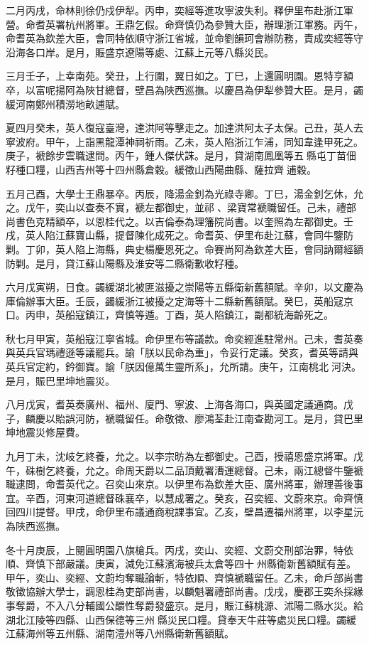 \begin{pinyinscope}
二月丙戌，命林則徐仍戍伊犁。丙申，奕經等進攻寧波失利。釋伊里布赴浙江軍營。命耆英署杭州將軍。王鼎乞假。命齊慎仍為參贊大臣，辦理浙江軍務。丙午，命耆英為欽差大臣，會同特依順守浙江省城，並命劉韻珂會辦防務，責成奕經等守沿海各口岸。是月，賑盛京遼陽等處、江蘇上元等八縣災民。

三月壬子，上幸南苑。癸丑，上行圍，翼日如之。丁巳，上還圓明園。恩特亨額卒，以富呢揚阿為陜甘總督，壁昌為陜西巡撫。以慶昌為伊犁參贊大臣。是月，蠲緩河南鄭州積澇地畝逋賦。

夏四月癸未，英人復寇臺灣，達洪阿等擊走之。加達洪阿太子太保。己丑，英人去寧波府。甲午，上詣黑龍潭神祠祈雨。乙未，英人陷浙江乍浦，同知韋逢甲死之。庚子，褫餘步雲職逮問。丙午，鍾人傑伏誅。是月，貸湖南鳳凰等五縣屯丁苗佃籽種口糧，山西吉州等十四州縣倉穀。緩徵山西陽曲縣、薩拉齊逋穀。

五月己酉，大學士王鼎暴卒。丙辰，降湯金釗為光祿寺卿。丁巳，湯金釗乞休，允之。戊午，奕山以查奏不實，褫左都御史，並祁、梁寶常褫職留任。己未，禮部尚書色克精額卒，以恩桂代之。以吉倫泰為理籓院尚書。以奎照為左都御史。壬戌，英人陷江蘇寶山縣，提督陳化成死之。命耆英、伊里布赴江蘇，會同牛鑒防剿。丁卯，英人陷上海縣，典史楊慶恩死之。命賽尚阿為欽差大臣，會同訥爾經額防剿。是月，貸江蘇山陽縣及淮安等二縣衛歉收籽種。

六月戊寅朔，日食。蠲緩湖北被匪滋擾之崇陽等五縣衛新舊額賦。辛卯，以文慶為庫倫辦事大臣。壬辰，蠲緩浙江被擾之定海等十二縣新舊額賦。癸巳，英船寇京口。丙申，英船寇鎮江，齊慎等遁。丁酉，英人陷鎮江，副都統海齡死之。

秋七月甲寅，英船寇江寧省城。命伊里布等議款。命奕經進駐常州。己未，耆英奏與英兵官瑪禮遜等議罷兵。諭「朕以民命為重」，令妥行定議。癸亥，耆英等請與英兵官定約，鈐御寶。諭「朕因億萬生靈所系」，允所請。庚午，江南桃北河決。是月，賑巴里坤地震災。

八月戊寅，耆英奏廣州、福州、廈門、寧波、上海各海口，與英國定議通商。戊子，麟慶以貽誤河防，褫職留任。命敬徵、廖鴻荃赴江南查勘河工。是月，貸巴里坤地震災修屋費。

九月丁未，沈岐乞終養，允之。以李宗昉為左都御史。己酉，授禧恩盛京將軍。戊午，硃樹乞終養，允之。命周天爵以二品頂戴署漕運總督。己未，兩江總督牛鑒褫職逮問，命耆英代之。召奕山來京。以伊里布為欽差大臣、廣州將軍，辦理善後事宜。辛酉，河東河道總督硃襄卒，以慧成署之。癸亥，召奕經、文蔚來京。命齊慎回四川提督。甲戌，命伊里布議通商稅課事宜。乙亥，壁昌遷福州將軍，以李星沅為陜西巡撫。

冬十月庚辰，上閱圓明園八旗槍兵。丙戌，奕山、奕經、文蔚交刑部治罪，特依順、齊慎下部嚴議。庚寅，減免江蘇濱海被兵太倉等四十州縣衛新舊額賦有差。甲午，奕山、奕經、文蔚均奪職論斬，特依順、齊慎褫職留任。乙未，命戶部尚書敬徵協辦大學士，調恩桂為吏部尚書，以麟魁署禮部尚書。戊戌，慶郡王奕糸採緣事奪爵，不入八分輔國公釂性奪爵發盛京。是月，賑江蘇桃源、沭陽二縣水災。給湖北江陵等四縣、山西保德等三州縣災民口糧。貸奉天牛莊等處災民口糧。蠲緩江蘇海州等五州縣、湖南澧州等八州縣衛新舊額賦。


\end{pinyinscope}
